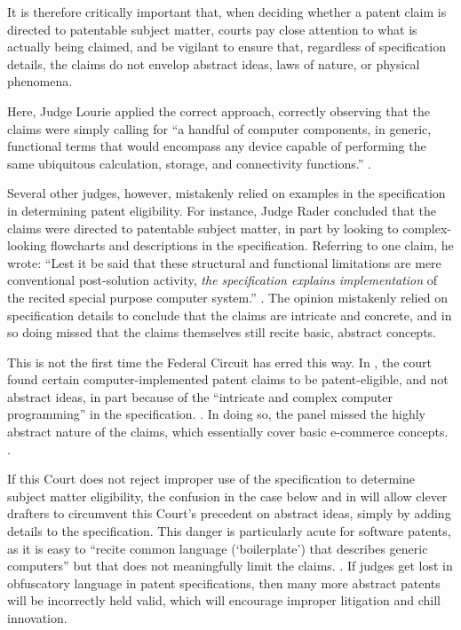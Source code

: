 \documentclass{scotus}
\begin{document}
It is therefore
critically important that, when deciding whether a patent claim is directed to
patentable subject matter, courts pay close
attention to what is actually being claimed, and be vigilant to ensure that,
regardless of specification details, the claims do not envelop abstract ideas,
laws of nature, or physical phenomena.

Here, Judge Lourie applied the correct approach,
correctly observing that the claims were simply calling for ``a handful of
computer components, in generic, functional terms that would encompass any
device capable of performing the same ubiquitous calculation, storage, and
connectivity functions.'' .

Several other judges, however, mistakenly relied on examples in the
specification in determining patent eligibility.
For instance, Judge Rader concluded that the claims
were directed to patentable subject matter, in part by looking to
complex-looking flowcharts and descriptions in the specification. Referring to
one claim, he wrote: ``Lest it be
said that these structural and functional limitations are
mere conventional post-solution activity, \emph{the specification explains
implementation} of the recited special purpose computer system.''
. The opinion mistakenly relied on
specification details to conclude that the claims are intricate and concrete,
and in so doing missed that the claims themselves still recite basic, abstract
concepts.

This is not the first time the Federal Circuit has erred this way.
In , the court found certain
computer-implemented patent claims to be patent-eligible, and not abstract
ideas, in part because of the ``intricate and complex computer programming''
in the specification. . In doing so, the panel missed the
highly abstract nature of the claims, which essentially cover basic e-commerce
concepts. .

If this Court does not reject improper use of the specification
to determine subject matter eligibility, the confusion in the case below
and in  will allow clever
drafters to circumvent this Court's precedent on abstract ideas,
simply by adding details to the specification. This danger is particularly acute
for software patents, as it is easy to ``recite common language (`boilerplate')
that
describes generic computers'' but that does
not meaningfully limit the claims.
. If judges get lost in obfuscatory
language in patent specifications, then many more abstract patents will be
incorrectly held valid, which will encourage improper litigation and
chill innovation.
\end{document}
